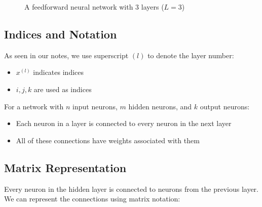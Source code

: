 \begin{figure}[h]
\centering
{}
\caption{A feedforward neural network with 3 layers ($L=3$)}
\end{figure}

\subsection{Indices and Notation}
As seen in our notes, we use superscript $(l)$ to denote the layer number:
\begin{itemize}
    \item $x^{(l)}$ indicates indices
    \item $i, j, k$ are used as indices
\end{itemize}

For a network with $n$ input neurons, $m$ hidden neurons, and $k$ output neurons:
\begin{itemize}
    \item Each neuron in a layer is connected to every neuron in the next layer
    \item All of these connections have weights associated with them
\end{itemize}

\subsection{Matrix Representation}
Every neuron in the hidden layer is connected to neurons from the previous layer. We can represent the connections using matrix notation:

